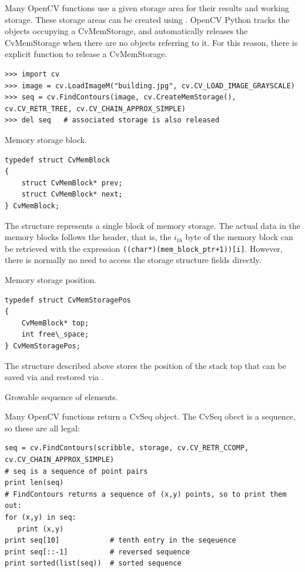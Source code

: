 Many OpenCV functions use a given storage area for their results
and working storage.  These storage areas can be created using
.  OpenCV Python tracks the objects occupying a
CvMemStorage, and automatically releases the CvMemStorage when there are
no objects referring to it.  For this reason, there is explicit function
to release a CvMemStorage.

\begin{lstlisting}
>>> import cv
>>> image = cv.LoadImageM("building.jpg", cv.CV_LOAD_IMAGE_GRAYSCALE)
>>> seq = cv.FindContours(image, cv.CreateMemStorage(), cv.CV_RETR_TREE, cv.CV_CHAIN_APPROX_SIMPLE)
>>> del seq   # associated storage is also released
\end{lstlisting}
\fi %

\ifC
{}\label{CvMemBlock}
Memory storage block.

\begin{lstlisting}
typedef struct CvMemBlock
{
    struct CvMemBlock* prev;
    struct CvMemBlock* next;
} CvMemBlock;
\end{lstlisting}

The structure  represents a single block of memory
storage. The actual data in the memory blocks follows the header, that is,
the $i_{th}$ byte of the memory block can be retrieved with the expression
\texttt{((char*)(mem\_block\_ptr+1))[i]}. However, there is normally no need
to access the storage structure fields directly.

\label{CvMemStoragePos}
Memory storage position.

\begin{lstlisting}
typedef struct CvMemStoragePos
{
    CvMemBlock* top;
    int free\_space;
} CvMemStoragePos;
\end{lstlisting}

The structure described above stores the position of the stack top that can be saved via  and restored via .

\fi

\label{CvSeq}
Growable sequence of elements.

\ifPy
Many OpenCV functions return a CvSeq object.  The CvSeq obect is a sequence, so these are all legal:
\begin{lstlisting}
seq = cv.FindContours(scribble, storage, cv.CV_RETR_CCOMP, cv.CV_CHAIN_APPROX_SIMPLE)
# seq is a sequence of point pairs
print len(seq)
# FindContours returns a sequence of (x,y) points, so to print them out:
for (x,y) in seq:
   print (x,y)
print seq[10]            # tenth entry in the seqeuence
print seq[::-1]          # reversed sequence
print sorted(list(seq))  # sorted sequence
\end{lstlisting}

